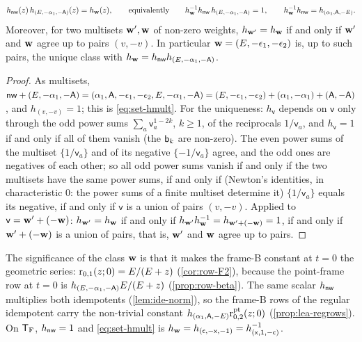 \begin{lem}
\label{lem:set-hmult}
\begin{equation}
\label{eq:set-hmult}
h_{\mathsf{nw}}(z)\,h_{(E,-\alpha_1,-\mathsf{A})}(z)=h_{\mathbf{w}}(z),\qquad\text{equivalently}\qquad h_{\mathbf{w}}^{-1}h_{\mathsf{nw}}\,h_{(E,-\alpha_1,-\mathsf{A})}=1,\qquad h_{\mathbf{w}}^{-1}h_{\mathsf{nw}}=h_{(\alpha_1,\mathsf{A},-E)} .
\end{equation}
Moreover, for two multisets $\mathbf{w}',\mathbf{w}$ of non-zero weights, $h_{\mathbf{w}'}=h_{\mathbf{w}}$ if and only if $\mathbf{w}'$ and $\mathbf{w}$ agree up to pairs $(v,-v)$. In particular $\mathbf{w}=(E,-\epsilon_1,-\epsilon_2)$ is, up to such pairs, the unique class with $h_{\mathbf{w}}=h_{\mathsf{nw}} h_{(E,-\alpha_1,-\mathsf{A})}$.
\end{lem}

\begin{proof}
As multisets, $\mathsf{nw}+(E,-\alpha_1,-\mathsf{A})=(\alpha_1,\mathsf{A},-\epsilon_1,-\epsilon_2,E,-\alpha_1,-\mathsf{A})=(E,-\epsilon_1,-\epsilon_2)+(\alpha_1,-\alpha_1)+(\mathsf{A},-\mathsf{A})$, and $h_{(v,-v)}=1$; this is \eqref{eq:set-hmult}. For the uniqueness: $h_{\mathsf{v}}$ depends on $\mathsf{v}$ only through the odd power sums $\sum_a\mathsf{v}_a^{1-2k}$, $k\geq1$, of the reciprocals $1/\mathsf{v}_a$, and $h_{\mathsf{v}}=1$ if and only if all of them vanish (the $\mathsf{b}_k$ are non-zero). The even power sums of the multiset $\{1/\mathsf{v}_a\}$ and of its negative $\{-1/\mathsf{v}_a\}$ agree, and the odd ones are negatives of each other; so all odd power sums vanish if and only if the two multisets have the same power sums, if and only if (Newton's identities, in characteristic $0$: the power sums of a finite multiset determine it) $\{1/\mathsf{v}_a\}$ equals its negative, if and only if $\mathsf{v}$ is a union of pairs $(v,-v)$. Applied to $\mathsf{v}=\mathbf{w}'+(-\mathbf{w})$: $h_{\mathbf{w}'}=h_{\mathbf{w}}$ if and only if $h_{\mathbf{w}'}h_{\mathbf{w}}^{-1}=h_{\mathbf{w}'+(-\mathbf{w})}=1$, if and only if $\mathbf{w}'+(-\mathbf{w})$ is a union of pairs, that is, $\mathbf{w}'$ and $\mathbf{w}$ agree up to pairs.
\end{proof}

The significance of the class $\mathbf{w}$ is that it makes the frame-B constant at $t=0$ the geometric series: $\mathrm{r}_{0,1}(z;0)=E/(E+z)$ (\cref{cor:row-F2}), because the point-frame row at $t=0$ is $h_{(E,-\alpha_1,-\mathsf{A})}E/(E+z)$ (\cref{prop:row-beta}). The same scalar $h_{\mathsf{nw}}$ multiplies both idempotents (\cref{lem:ide-norm}), so the frame-B rows of the regular idempotent carry the non-trivial constant $h_{(\alpha_1,\mathsf{A},-E)}\mathrm{r}^{\mathrm{pt}}_{0,2}(z;0)$ (\cref{prop:lea-regrows}). On $\mathsf{T}_{\mathrm{F}}$, $h_{\mathsf{nw}}=1$ and \eqref{eq:set-hmult} is $h_{\mathbf{w}}=h_{(\mathsf{c},-\mathsf{x},-1)}=h_{(\mathsf{x},1,-\mathsf{c})}^{-1}$.

